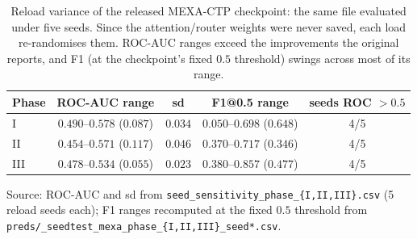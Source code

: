 \documentclass[a4paper,fleqn]{cas-sc}
\begin{document}
\begin{table}[t]
\centering\small
\caption{Reload variance of the released MEXA-CTP checkpoint: the same file evaluated under
five seeds. Since the attention/router weights were never saved, each load re-randomises
them. ROC-AUC ranges exceed the improvements the original reports, and F1 (at the
checkpoint's fixed $0.5$ threshold) swings across most of its range.}
\label{tab:reload}
\begin{tabular}{lcccc}
\toprule
Phase & ROC-AUC range & sd & F1@0.5 range & seeds ROC $>0.5$ \\
\midrule
I   & $0.490$--$0.578$
($0.087$)& $0.034$ & $0.050$--$0.698$
($0.648$)& 4/5 \\
II  & $0.454$--$0.571$
($0.117$)& $0.046$ & $0.370$--$0.717$
($0.346$)& 4/5 \\
III & $0.478$--$0.534$
($0.055$)& $0.023$ & $0.380$--$0.857$
($0.477$)& 4/5 \\
\bottomrule
\end{tabular}
\begin{minipage}{\linewidth}\vspace{2pt}\scriptsize Source: ROC-AUC and sd from \texttt{seed\_sensitivity\_phase\_\{I,II,III\}.csv} (5 reload seeds each); F1 ranges recomputed at the fixed $0.5$ threshold from \texttt{preds/\_seedtest\_mexa\_phase\_\{I,II,III\}\_seed*.csv}. \end{minipage}
\end{table}
\end{document}
